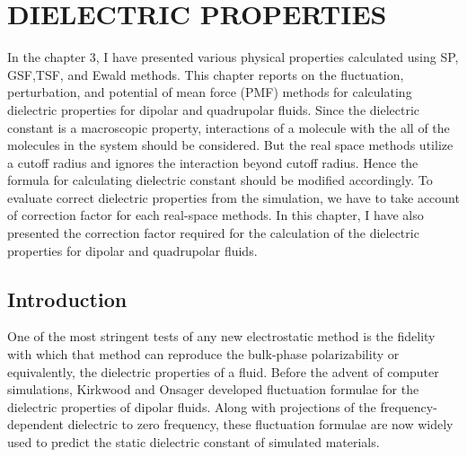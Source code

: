 %
%
%
%
%
%
%
%
%
%

%
%

\chapter{DIELECTRIC PROPERTIES}
\label{chap:dielectric}
In the chapter 3, I have presented various physical properties calculated using SP, GSF,TSF, and Ewald methods. This chapter reports on the fluctuation, perturbation, and potential of mean force (PMF) methods for calculating dielectric properties for dipolar and quadrupolar fluids. Since the dielectric constant is a macroscopic property, interactions of a molecule with the all of the molecules in the system should be considered. But the real space methods utilize a cutoff radius and ignores the interaction beyond cutoff radius. Hence the formula for calculating dielectric constant should be modified accordingly. To evaluate correct dielectric properties from the simulation, we have to take account of correction factor for each real-space methods. In this chapter, I have also presented the correction factor required for the calculation of the dielectric properties for dipolar and quadrupolar fluids.

\section{Introduction}

One of the most stringent tests of any new electrostatic method is the
fidelity with which that method can reproduce the bulk-phase
polarizability or equivalently, the dielectric properties of a
fluid. Before the advent of computer simulations, Kirkwood and Onsager
developed fluctuation formulae for the dielectric properties of
dipolar fluids.\cite{Kirkwood39,Onsagar36} Along with projections of
the frequency-dependent dielectric to zero frequency, these
fluctuation formulae are now widely used to predict the static
dielectric constant of simulated materials.

